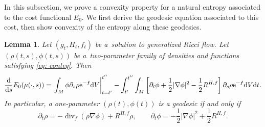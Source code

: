 \documentclass[11pt]{article}
\numberwithin{equation}{section}
\numberwithin{equation}{section}
\newtheorem{Lemma}[thm]{Lemma}
\newcommand{\del}{\partial}
\newcommand{\N}{\nabla}
\DeclareMathOperator{\divg}{div}
\begin{document}
In this subsection, we prove a convexity property for a natural entropy associated to the cost functional $E_0$. We first derive the geodesic equation associated to this cost, then show convexity of the entropy along these geodesics.

\begin{Lemma}\label{lemma: el} Let $(g_t,H_t, f_t)$ be a~solution to generalized Ricci flow. Let
$(\rho(t,s), \phi(t,s))$ be a~two-parameter family of densities and functions satisfying \eqref{eq: conteq}. Then
	\begin{align*}
	\frac{{\rm d}}{{\rm d}s}E_0(\mu(\cdot,s))=\left.\int_M\phi\partial_s\rho {\rm e}^{-f} {\rm d}V\right|_{t=t'}^{t''}
	-\int_{t'}^{t''}\int_M\left[\partial_t\phi+\frac12|\nabla\phi|^2 -\frac12 R^{H,f}\right] \partial_s\rho {\rm e}^{-f} {\rm d}V{\rm d}t.
	\end{align*}
 In particular, a one-parameter $(\rho(t), \phi(t))$ is a geodesic if and only if
\begin{equation}\label{eq: geodesic}
\del_t \rho=-\divg_f(\rho\N\phi)+R^{H,f}\rho,\qquad
\del_t\phi=-\frac12|\N\phi|^2+\frac12 R^{H,f}.
\end{equation}
\end{Lemma}
\end{document}
